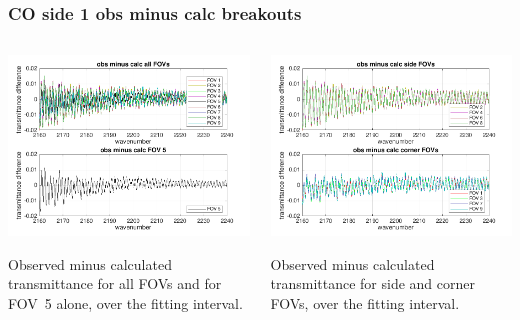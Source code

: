 \documentclass[10pt]{beamer}
\begin{document}
\begin{frame}
\frametitle{CO side 1 obs minus calc breakouts}
\begin{columns}[t]
\begin{column}{0.5\textwidth}
  \begin{centering}
  \includegraphics[width=\textwidth]{01-13_pfh_s1_CO/CO_breakout_1.png}
  \end{centering}\vspace{3mm}

Observed minus calculated transmittance for all FOVs and for FOV~5
alone, over the fitting interval.

\end{column}
\begin{column}{0.5\textwidth}  
  \begin{centering}
  \includegraphics[width=\textwidth]{01-13_pfh_s1_CO/CO_breakout_2.png}
  \end{centering}\vspace{3mm}

Observed minus calculated transmittance for side and corner FOVs,
over the fitting interval.

\end{column}
\end{columns}
\end{frame}
\end{document}
